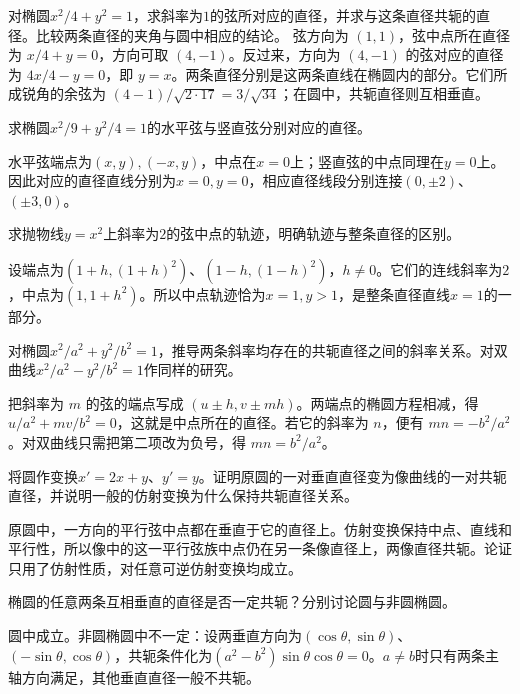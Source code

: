 对椭圆\(x^2/4+y^2=1\)，求斜率为\(1\)的弦所对应的直径，并求与这条直径共轭的直径。比较两条直径的夹角与圆中相应的结论。
\solutionanswer
弦方向为 \((1,1)\)，弦中点所在直径为 \(x/4+y=0\)，方向可取 \((4,-1)\)。反过来，方向为 \((4,-1)\) 的弦对应的直径为 \(4x/4-y=0\)，即 \(y=x\)。两条直径分别是这两条直线在椭圆内的部分。它们所成锐角的余弦为 \((4-1)/\sqrt{2\cdot17}=3/\sqrt{34}\)；在圆中，共轭直径则互相垂直。


求椭圆\(x^2/9+y^2/4=1\)的水平弦与竖直弦分别对应的直径。
\par
\solutionanswer
水平弦端点为\((x,y),(-x,y)\)，中点在\(x=0\)上；竖直弦的中点同理在\(y=0\)上。因此对应的直径直线分别为\(x=0,y=0\)，相应直径线段分别连接\((0,\pm2)\)、\((\pm3,0)\)。


求抛物线\(y=x^2\)上斜率为\(2\)的弦中点的轨迹，明确轨迹与整条直径的区别。
\par
\solutionanswer
设端点为\((1+h,(1+h)^2)\)、\((1-h,(1-h)^2)\)，\(h\ne0\)。它们的连线斜率为\(2\)，中点为\((1,1+h^2)\)。所以中点轨迹恰为\(x=1,y>1\)，是整条直径直线\(x=1\)的一部分。


对椭圆\(x^2/a^2+y^2/b^2=1\)，推导两条斜率均存在的共轭直径之间的斜率关系。对双曲线\(x^2/a^2-y^2/b^2=1\)作同样的研究。
\par
\solutionanswer
把斜率为 \(m\) 的弦的端点写成 \((u\pm h,v\pm mh)\)。两端点的椭圆方程相减，得 \(u/a^2+mv/b^2=0\)，这就是中点所在的直径。若它的斜率为 \(n\)，便有 \(mn=-b^2/a^2\)。对双曲线只需把第二项改为负号，得 \(mn=b^2/a^2\)。


将圆作变换\(x'=2x+y\)、\(y'=y\)。证明原圆的一对垂直直径变为像曲线的一对共轭直径，并说明一般的仿射变换为什么保持共轭直径关系。
\par
\solutionanswer
原圆中，一方向的平行弦中点都在垂直于它的直径上。仿射变换保持中点、直线和平行性，所以像中的这一平行弦族中点仍在另一条像直径上，两像直径共轭。论证只用了仿射性质，对任意可逆仿射变换均成立。


椭圆的任意两条互相垂直的直径是否一定共轭？分别讨论圆与非圆椭圆。
\par
\solutionanswer
圆中成立。非圆椭圆中不一定：设两垂直方向为\((\cos\theta,\sin\theta)\)、\((-\sin\theta,\cos\theta)\)，共轭条件化为\((a^2-b^2)\sin\theta\cos\theta=0\)。\(a\ne b\)时只有两条主轴方向满足，其他垂直直径一般不共轭。


